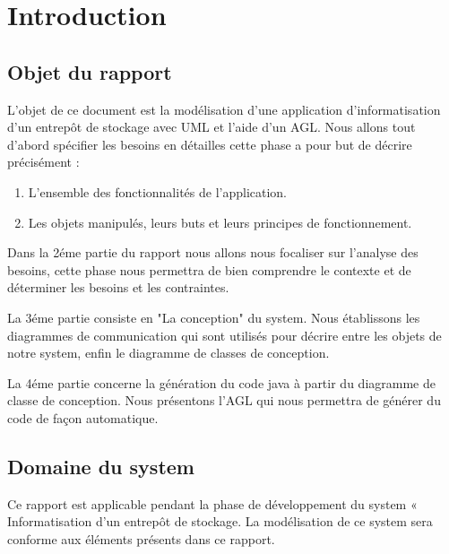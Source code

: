\chapter*{Introduction}
\label{chap:Introduction}

	\section*{Objet du rapport}
L'objet de ce document est la modélisation d'une application d'informatisation d'un entrepôt de stockage avec UML et l'aide d'un AGL.
	Nous allons tout d'abord spécifier les besoins en détailles cette phase a pour but de décrire précisément :
	\begin{enumerate}[label=\textbullet]
	\item L'ensemble des fonctionnalités de l'application.
	\item Les objets manipulés, leurs buts et leurs principes de fonctionnement.
	\end{enumerate}
	
	Dans la 2éme partie du rapport nous allons nous focaliser sur l'analyse des besoins, cette phase nous permettra de bien comprendre le contexte et de déterminer les besoins et les contraintes.
	
	La 3éme partie consiste en "La conception" du system. Nous établissons les diagrammes de communication qui sont utilisés pour décrire entre les objets de notre system, enfin le diagramme de classes de conception.
	
	La 4éme partie concerne la génération du code java à partir du diagramme de classe de conception. Nous présentons l'AGL qui nous permettra de générer du code de façon automatique.
	
	\section*{Domaine du system}
Ce rapport est applicable pendant la phase de développement du system « Informatisation d'un entrepôt de stockage.
La modélisation de ce system sera conforme aux éléments présents dans ce rapport.


